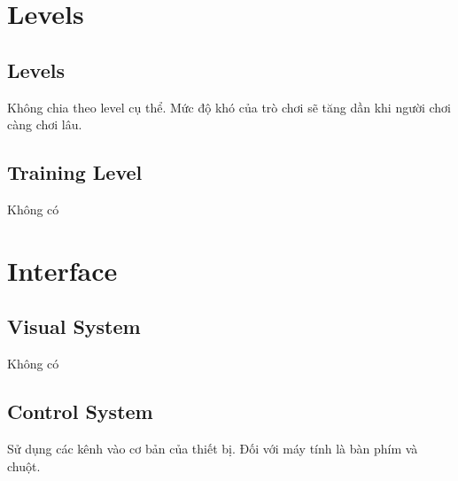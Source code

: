 \documentclass[../report.tex]{subfiles}
\begin{document}
\section{Levels}
\subsection{Levels}
Không chia theo level cụ thể. Mức độ khó của trò chơi sẽ tăng dần khi người chơi càng chơi lâu. 
\subsection{Training Level}
Không có

\section{Interface}
\subsection{Visual System}
Không có

\subsection{Control System}
Sử dụng các kênh vào cơ bản của thiết bị. Đối với máy tính là bàn phím và chuột.
\end{document}
